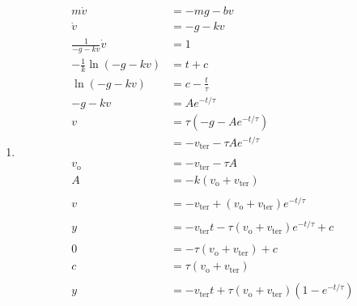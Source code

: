 \documentclass{article}
\begin{document}
\begin{enumerate}
  \item

        \begin{align*}
          m \dot{v}                   & = -m g - b v                                                             \\
          \dot{v}                     & = -g - k v                                                               \\
          \frac{1}{-g - k v} \dot{v}  & = 1                                                                      \\
          -\frac{1}{k} \ln (-g - k v) & = t + c                                                                  \\
          \ln (-g - k v)              & = c - \frac{t}{\tau}                                                     \\
          -g - k v                    & = A e^{-t / \tau}                                                        \\
          v                           & = \tau (-g - A e^{-t / \tau})                                            \\
                                      & = -v_\text{ter} - \tau A e^{-t / \tau}                                   \\ \\
          v_\text{o}                  & = -v_\text{ter} - \tau A                                                 \\
          A                           & = -k (v_\text{o} + v_\text{ter})                                         \\ \\
          v                           & = -v_\text{ter} + (v_\text{o} + v_\text{ter}) e^{-t / \tau}              \\ \\
          y                           & = -v_\text{ter} t - \tau (v_\text{o} + v_\text{ter}) e^{-t / \tau} + c   \\ \\
          0                           & = -\tau (v_\text{o} + v_\text{ter}) + c                                  \\
          c                           & = \tau (v_\text{o} + v_\text{ter})                                       \\ \\
          y                           & = -v_\text{ter} t + \tau (v_\text{o} + v_\text{ter}) (1 - e^{-t / \tau})
        \end{align*}


\end{enumerate}
\end{document}
